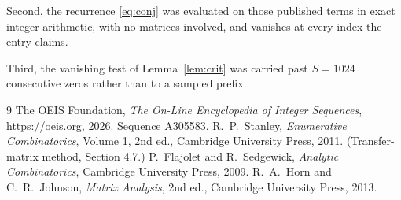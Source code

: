 \documentclass[11pt,a4paper]{article}
\theoremstyle{plain}
\theoremstyle{definition}
\begin{document}
Second, the recurrence \eqref{eq:conj} was evaluated on those published terms in exact
integer arithmetic, with no matrices involved, and vanishes at every index the entry claims.

Third, the vanishing test of Lemma~\ref{lem:crit} was carried past $S=1024$ consecutive
zeros rather than to a sampled prefix.

\begin{thebibliography}{9}
 The OEIS Foundation, \emph{The On-Line Encyclopedia of Integer
Sequences}, \url{https://oeis.org}, 2026. Sequence A305583.
 R.~P.~Stanley, \emph{Enumerative Combinatorics}, Volume 1, 2nd ed.,
Cambridge University Press, 2011. (Transfer-matrix method, Section 4.7.)
 P.~Flajolet and R.~Sedgewick, \emph{Analytic Combinatorics}, Cambridge
University Press, 2009.
 R.~A.~Horn and C.~R.~Johnson, \emph{Matrix Analysis}, 2nd ed., Cambridge
University Press, 2013.
\end{thebibliography}
\end{document}
